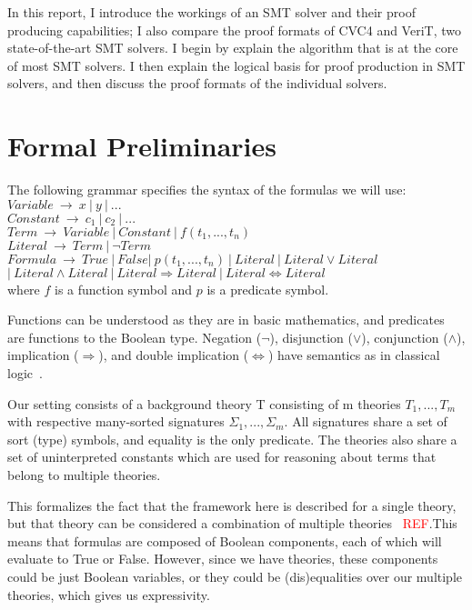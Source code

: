 \documentclass{report}
\begin{document}
In this report, I introduce the workings of an SMT solver 
and their proof producing capabilities; I also compare the 
proof formats of CVC4 and VeriT, two state-of-the-art SMT solvers. I begin by explain the algorithm that is at the core 
of most SMT solvers. I then explain the logical basis for 
proof production in SMT solvers, and then discuss the proof 
formats of the individual solvers.


\section{Formal Preliminaries}
\label{sec:prelim}
The following grammar specifies the syntax of the formulas we
will use: \\ 
$Variable\ \rightarrow\ x\ |\ y\ |\ ... $ \\
$Constant\ \rightarrow\ c_1\ |\ c_2\ |\ ... $ \\
$Term\ \rightarrow\ Variable\ |\ Constant\ |\ f(t_1, ..., t_n)$ \\
$Literal\ \rightarrow\ Term\ |\ \neg Term$ \\
$Formula\ \rightarrow\ True\ |\ False |\ p(t_1, ..., t_n)\ 
|\ Literal\ |\ Literal \lor Literal$ \\ 
$|\ Literal \land Literal\ |\ Literal \Rightarrow Literal\ |\ Literal \iff Literal$ \\
where $f$ is a function symbol and $p$ is a predicate symbol.

Functions can be understood as they are in basic mathematics, 
and predicates are functions to the Boolean type. Negation 
($\neg$), disjunction ($\lor$), conjunction ($\land$), implication ($\Rightarrow$), and double implication
($\iff$) have semantics as in classical logic~\cite{prop}.

Our setting consists of a background theory T consisting 
of m theories $T_1, ..., T_m$ with respective many-sorted 
signatures $\Sigma_1, ..., \Sigma_m$. All signatures share 
a set of sort (type) symbols, and equality is the only 
predicate. The theories also share a set of 
uninterpreted constants which are used for reasoning about 
terms that belong to multiple theories. 

This formalizes the fact that the framework here is 
described for a single theory, but that theory can 
be considered a combination of multiple theories~\cite{Manna2003}
\textcolor{red}{REF}.This means that formulas are 
composed of Boolean components, each of which will 
evaluate to True or False. However, since 
we have theories, these components could be just Boolean 
variables, or they could be (dis)equalities over our 
multiple theories, which gives us expressivity. 
\end{document}
